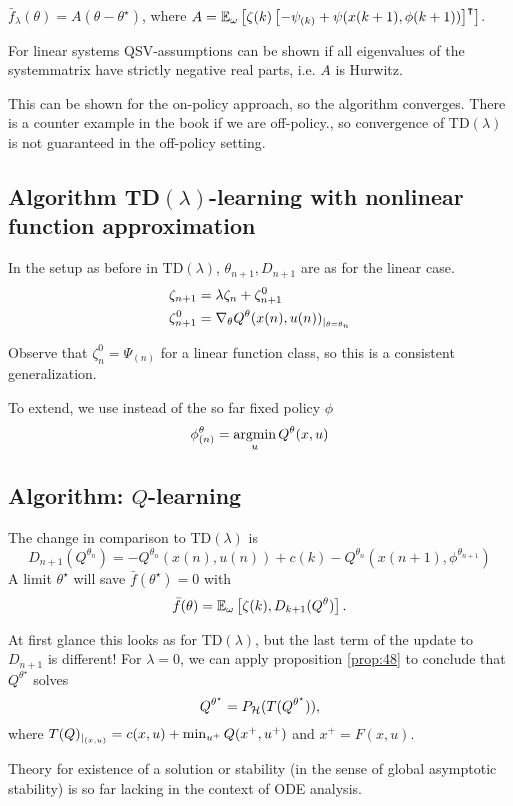 \(\bar{f}_\lambda(\theta)=A(\theta-\theta^\star)\), where 
\(A=\mathbb{E}_\omega\left[\zeta(k)\left[-\psi_{(k)}+\psi(x(k+1),\phi(k+1))\right]^\intercal\right]\).

For linear systems QSV-assumptions can be shown if all eigenvalues of the systemmatrix have 
strictly negative real parts,  i.e. \(A\) is Hurwitz.

This can be shown for the on-policy approach, so the algorithm converges. There is a counter example in the book
if we are off-policy., so convergence of TD\((\lambda)\) is not guaranteed in the off-policy setting.

\subsection{Algorithm TD\((\lambda)\)-learning with nonlinear function approximation}

In the setup as before in TD\((\lambda)\), \(\theta_{n+1},D_{n+1}\) are 
as for the linear case.
\begin{align*}
    \zeta_{n+1}&=\lambda\zeta_{n}+\zeta_{n+1}^0\\
    \zeta_{n+1}^0&=\nabla_\theta Q^\theta(x(n),u(n))_{|_{\theta=\theta_n}}  
\end{align*}

Observe that \(\zeta_n^0=\Psi_{(n)}\) for a linear function class, so this is a consistent 
generalization.

To extend, we use instead of the so far fixed policy \(\phi\)
\[\phi_{(n)}^\theta=\operatorname*{\text{argmin}}_{u} Q^\theta(x,u)\]
\subsection{Algorithm: \(Q\)-learning}
The change in comparison to TD\((\lambda)\) is  
\[D_{n+1}(Q^{\theta_n})=-Q^{\theta_n}(x(n),u(n))+c(k)-Q^{\theta_n}(x(n+1),\phi^{\theta_{n+1}})\]
A limit \(\theta^\star\) will save \(\bar{f}(\theta^\star)=0\) with 
\[\bar{f}(\theta) = \mathbb{E}_\omega\left[\zeta(k),D_{k+1}(Q^\theta)\right].\]

At first glance this looks as for TD\((\lambda)\), but the last term of the update to \(D_{n+1}\)
is different! For \(\lambda=0\), we can apply proposition \ref{prop:48} to conclude that 
\(Q^{\theta^\star}\) solves 
\[Q^{\theta^\star}=P_{\mathcal{H}}(T(Q^{\theta^\star})),\]
where \(T(Q)_{|_{(x,u)}}=c(x,u)+\min_{u^+}Q(x^+,u^+)\) and \(x^+=F(x,u)\).

Theory for existence of a solution or stability (in the sense of global asymptotic stability)
is so far lacking in the context of ODE analysis.

